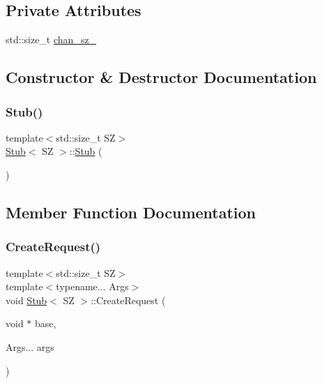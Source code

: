 \subsection*{Private Attributes}
\begin{DoxyCompactItemize}
\item 
std\+::size\+\_\+t \hyperlink{classStub_a758cf7539d362589c476e72ed8cb01cf}{chan\+\_\+sz\+\_\+}
\end{DoxyCompactItemize}


\subsection{Constructor \& Destructor Documentation}
\mbox{\label{classStub_ae7629b6acb5ded1513e9ab73f293f93e}} 
\subsubsection{\texorpdfstring{Stub()}{Stub()}}
{\footnotesize\ttfamily template$<$std\+::size\+\_\+t SZ$>$ \\
\hyperlink{classStub}{Stub}$<$ SZ $>$\+::\hyperlink{classStub}{Stub} (\begin{DoxyParamCaption}{ }\end{DoxyParamCaption})\hspace{0.3cm}{\ttfamily [inline]}}



\subsection{Member Function Documentation}
\mbox{\label{classStub_ab83bdd8197df762e5763c2ef937ae0e5}} 
\subsubsection{\texorpdfstring{Create\+Request()}{CreateRequest()}}
{\footnotesize\ttfamily template$<$std\+::size\+\_\+t SZ$>$ \\
template$<$typename... Args$>$ \\
void \hyperlink{classStub}{Stub}$<$ SZ $>$\+::Create\+Request (\begin{DoxyParamCaption}\item[{void $\ast$}]{base,  }\item[{Args...}]{args }\end{DoxyParamCaption})\hspace{0.3cm}{\ttfamily [inline]}}

